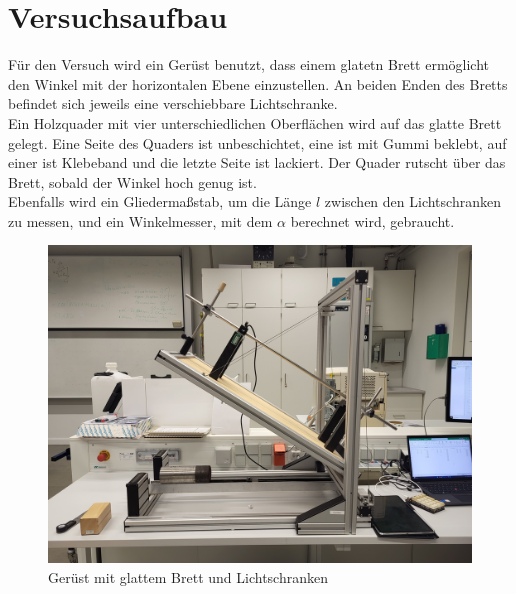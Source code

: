 \section{Versuchsaufbau}

Für den Versuch wird ein Gerüst benutzt, dass einem glatetn Brett ermöglicht den Winkel mit der horizontalen Ebene einzustellen. An beiden Enden des Bretts befindet sich jeweils eine verschiebbare Lichtschranke.\\
Ein Holzquader mit vier unterschiedlichen Oberflächen wird auf das glatte Brett gelegt. Eine Seite des Quaders ist unbeschichtet, eine ist mit Gummi beklebt, auf einer ist Klebeband und die letzte Seite ist lackiert. Der Quader rutscht über das Brett, sobald der Winkel hoch genug ist.\\
Ebenfalls wird ein Gliedermaßstab, um die Länge $l$ zwischen den Lichtschranken zu messen, und ein Winkelmesser, mit dem $\alpha$ berechnet wird, gebraucht.
\begin{figure}[ht]
    \centering
    \includegraphics[width=\linewidth/2]{images/Versuch-Aufbau.jpg}
    \caption[Aufbau]{Gerüst mit glattem Brett und Lichtschranken}
    \label{fig:Aufbau}
\end{figure}